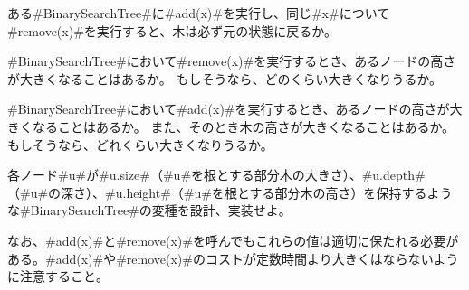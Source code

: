\begin{exc}
ある#BinarySearchTree#に#add(x)#を実行し、同じ#x#について#remove(x)#を実行すると、木は必ず元の状態に戻るか。
\end{exc}

\begin{exc}
#BinarySearchTree#において#remove(x)#を実行するとき、あるノードの高さが大きくなることはあるか。
もしそうなら、どのくらい大きくなりうるか。
\end{exc}

\begin{exc}
#BinarySearchTree#において#add(x)#を実行するとき、あるノードの高さが大きくなることはあるか。
また、そのとき木の高さが大きくなることはあるか。
もしそうなら、どれくらい大きくなりうるか。
\end{exc}

\begin{exc}
各ノード#u#が#u.size#（#u#を根とする部分木の大きさ）、#u.depth#（#u#の深さ）、#u.height#（#u#を根とする部分木の高さ）を保持するような#BinarySearchTree#の変種を設計、実装せよ。

なお、#add(x)#と#remove(x)#を呼んでもこれらの値は適切に保たれる必要がある。#add(x)#や#remove(x)#のコストが定数時間より大きくはならないように注意すること。
\end{exc}

